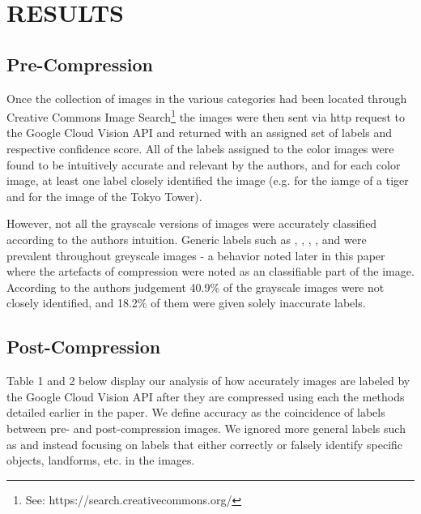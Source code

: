 \documentclass[letterpaper, 12 pt, conference]{ieeeconf}  %
\begin{document}
\vspace*{3mm}

\section{RESULTS}

\subsection{Pre-Compression}

Once the collection of images in the various categories had been located through Creative Commons Image Search\footnote{See: https://search.creativecommons.org/} the images were then sent via http request to the Google Cloud Vision API and returned with an assigned set of labels and respective confidence score.
All of the labels assigned to the color images were
found to be intuitively accurate and relevant by the authors, and for each color image,
at least one label closely identified the image (e.g. 
for the iamge of a tiger and  for the image of
the Tokyo Tower).

However, not all the grayscale versions of images were accurately classified according to the authors intuition.
Generic labels such as , , , ,
and  were prevalent throughout greyscale images - a behavior noted later in this paper where the artefacts of compression were noted as an classifiable part of the image. According to the authors judgement 40.9\% of the grayscale images
were not closely identified, and 18.2\% of them were given solely inaccurate labels.

\subsection{Post-Compression}

Table 1 and 2 below display our analysis of how accurately images are labeled by the
Google Cloud Vision API after they are compressed using each
the methods detailed earlier in the paper. We define accuracy as the coincidence of labels between pre- and post-compression images.  We ignored more general
labels such as  
and  instead focusing on labels that either correctly or falsely
identify specific objects, landforms, etc. in the images.

\vspace*{2mm}
\end{document}
